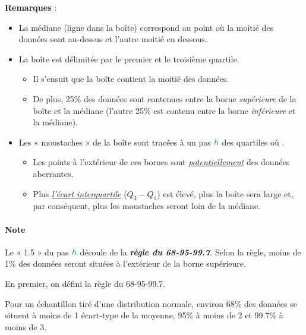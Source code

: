 \documentclass[french]{article}
\begin{document}
\begin{multicols*}{2}
\textbf{Remarques} :
\begin{itemize}
	\item	La médiane (ligne dans la boîte) correspond au point où la moitié des données sont au-dessus et l'autre moitié en dessous.
	\item	La boîte est délimitée par le premier et le troisième quartile.
		\begin{itemize}
		\item	Il s'ensuit que la boîte contient la moitié des données.
		\item	De plus, 25\% des données sont contenues entre la borne \textit{supérieure} de la boîte et la médiane (l'autre 25\% est contenu entre la borne \textit{inférieure} et la médiane).
		\end{itemize}
	\item	Les « moustaches » de la boîte sont tracées à un pas $\textcolor{teal}{h}$ des quartiles où .
		\begin{itemize}
		\item	Les points à l'extérieur de ces bornes sont \textit{\underline{potentiellement}} des données aberrantes.
		\item	Plus \textit{\color{bleudefrance}\underline{\hyperlink{IQR}{\color{bleudefrance} l'écart interquartile}}} ($Q_{3}	-	Q_{1}$) est élevé, plus la boîte sera large et, par conséquent, plus les moustaches seront loin de la médiane.
		\end{itemize}
\end{itemize}

\paragraph{Note}	Le « 1.5 » du pas $\textcolor{teal}{h}$ découle de la \textit{\textbf{règle du 68-95-99.7}}. Selon la règle, moins de 1\% des données seront situées à l'extérieur de la borne supérieure.

\bigskip

En premier, on défini la règle du 68-95-99.7.

\begin{definitionNOHFILLprop}
Pour un échantillon tiré d'une distribution normale, environ 68\% des données se situent à moins de 1 écart-type de la moyenne, 95\% à moins de 2 et 99.7\% à moins de 3.

\begin{center}	
\begin{tikzpicture}[x=0.75pt,y=0.75pt,yscale=-1,xscale=1]


\end{tikzpicture}
\end{center}
\end{definitionNOHFILLprop}
\end{multicols*}
\end{document}
